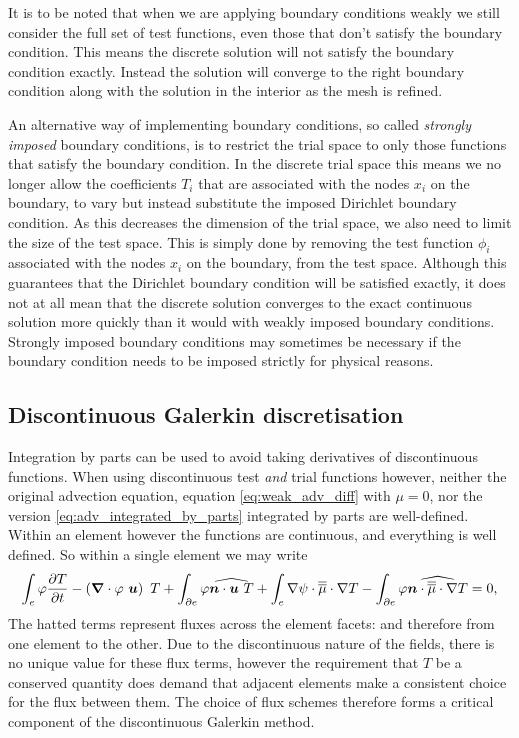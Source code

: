 It is to be noted that when we are applying boundary conditions weakly we
still consider the full set of test functions, even those that don't satisfy
the boundary condition. This means the discrete solution will not satisfy
the boundary condition exactly. Instead the solution will converge to the
right boundary condition along with the solution in the interior as the mesh
is refined.

 An alternative way of
implementing boundary conditions, so called \emph{strongly imposed} boundary
conditions, is to restrict the trial space to only those functions that
satisfy the boundary condition. In the discrete trial space this means we no
longer allow the coefficients $T_i$ that are associated with the nodes $x_i$
on the boundary, to vary but instead substitute the imposed Dirichlet
boundary condition. As this decreases the dimension of the trial space, we
also need to limit the size of the test space. This is simply done by
removing the test function $\phi_i$ associated with the nodes $x_i$ on the
boundary, from the test space. Although this guarantees that the Dirichlet
boundary condition will be satisfied exactly, it does not at all mean that
the discrete solution converges to the exact continuous solution more
quickly than it would with weakly imposed boundary conditions. Strongly
imposed boundary conditions may sometimes be necessary if the boundary
condition needs to be imposed strictly for physical reasons.

\subsection{Discontinuous Galerkin discretisation}\label{sec:NM_DG_advection}
Integration by parts can be used to avoid taking 
derivatives of discontinuous functions.
When using discontinuous test \emph{and} trial functions however, 
neither the original advection equation, equation \eqref{eq:weak_adv_diff} with $\mu=0$, 
nor the version \eqref{eq:adv_integrated_by_parts} integrated by parts are well-defined. 
Within an element however the functions are continuous, and everything is well defined. So within 
a single element we may write
\begin{equation}\label{eq:adv_integrated_by_parts}
  \int_e \varphi \frac{\partial T}{\partial t} -
    \left({\mbox{\boldmath$\nabla$}}\cdot \varphi~{\mbox{\boldmath$u$}}\right)~T +
    \int_{\partial e} \varphi\widehat{{\mbox{\boldmath$n$}}\cdot{\mbox{\boldmath$u$}}~T} + 
    \int_{e} \nabla\psi\cdot\overline{\overline{\mu}}\cdot\nabla T -
    \int_{\partial e} \varphi\widehat{{\mbox{\boldmath$n$}}\cdot\overline{\overline{\mu}}\cdot\nabla T}
    = 0,
\end{equation}
The hatted terms represent fluxes across the element facets: and therefore
from one element to the other. Due to the discontinuous nature of the
fields, there is no unique value for these flux terms, however the
requirement that $T$ be a conserved quantity does demand that adjacent
elements make a consistent choice for the flux between them. The choice of flux
schemes therefore forms a critical component of the discontinuous Galerkin method.

